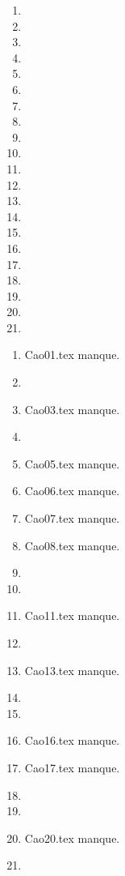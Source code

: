  
 
\begin{enumerate}
  \item  
  \item  
  \item  
  \item  
  \item  
  \item  
  \item  
  \item  
  \item  
  \item  
  \item  
  \item  
  \item  
  \item  
  \item  
  \item  
  \item  
  \item  
  \item  
  \item  
  \item  
\end{enumerate} 
\clearpage 
{}
\begin{enumerate}
  \item Cao01.tex manque. 
  \item  
  \item Cao03.tex manque. 
  \item  
  \item Cao05.tex manque. 
  \item Cao06.tex manque. 
  \item Cao07.tex manque. 
  \item Cao08.tex manque. 
  \item  
  \item  
  \item Cao11.tex manque. 
  \item  
  \item Cao13.tex manque. 
  \item  
  \item  
  \item Cao16.tex manque. 
  \item Cao17.tex manque. 
  \item  
  \item  
  \item Cao20.tex manque. 
  \item  
\end{enumerate} 
